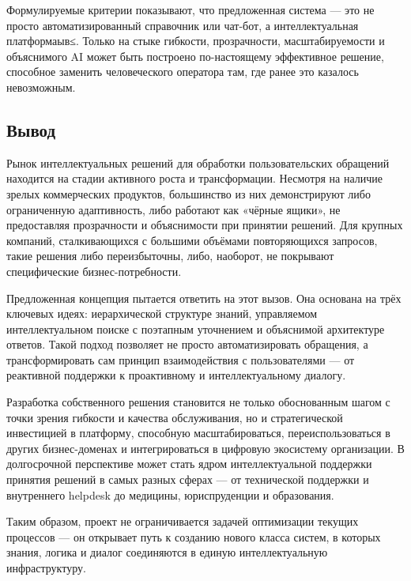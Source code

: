 Формулируемые критерии показывают, что предложенная система — это не просто автоматизированный справочник или чат-бот, а интеллектуальная платформаыв≤. Только на стыке гибкости, прозрачности, масштабируемости и объяснимого AI может быть построено по-настоящему эффективное решение, способное заменить человеческого оператора там, где ранее это казалось невозможным.

\subsection{Вывод}

Рынок интеллектуальных решений для обработки пользовательских обращений находится на стадии активного роста и трансформации. Несмотря на наличие зрелых коммерческих продуктов, большинство из них демонстрируют либо ограниченную адаптивность, либо работают как «чёрные ящики», не предоставляя прозрачности и объяснимости при принятии решений. Для крупных компаний, сталкивающихся с большими объёмами повторяющихся запросов, такие решения либо переизбыточны, либо, наоборот, не покрывают специфические бизнес-потребности.

Предложенная концепция пытается ответить на этот вызов. Она основана на трёх ключевых идеях: иерархической структуре знаний, управляемом интеллектуальном поиске с поэтапным уточнением и объяснимой архитектуре ответов. Такой подход позволяет не просто автоматизировать обращения, а трансформировать сам принцип взаимодействия с пользователями — от реактивной поддержки к проактивному и интеллектуальному диалогу.

Разработка собственного решения становится не только обоснованным шагом с точки зрения гибкости и качества обслуживания, но и стратегической инвестицией в платформу, способную масштабироваться, переиспользоваться в других бизнес-доменах и интегрироваться в цифровую экосистему организации. В долгосрочной перспективе может стать ядром интеллектуальной поддержки принятия решений в самых разных сферах — от технической поддержки и внутреннего helpdesk до медицины, юриспруденции и образования.

Таким образом, проект не ограничивается задачей оптимизации текущих процессов — он открывает путь к созданию нового класса систем, в которых знания, логика и диалог соединяются в единую интеллектуальную инфраструктуру.
